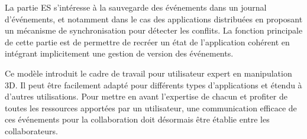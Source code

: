 La partie \gls{ES} s'intéresse à la sauvegarde des événements dans un journal 
d'événements, et notamment dans le cas des applications distribuées en proposant 
un mécanisme de synchronisation pour détecter les conflits. La fonction principale 
de cette partie est de permettre de recréer un état de l'application cohérent en 
intégrant implicitement une gestion de version des événements.

Ce modèle introduit le cadre de travail pour utilisateur expert en manipulation 
\gls{3D}. Il 
peut être facilement adapté pour différents types d'applications et étendu à 
d'autres utilisations. 
Pour mettre en avant l'expertise de chacun et profiter de 
toutes les ressources apportées par un utilisateur, une communication efficace de 
ces événements pour la collaboration doit désormais être établie entre les 
collaborateurs.